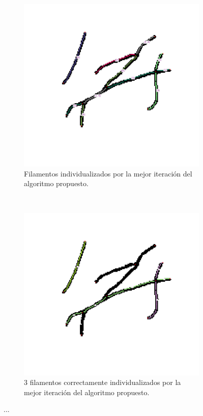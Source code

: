 \begin{figure}[h!]
    \begin{subfigure}[t]{0.49\textwidth}
        \centering
        \includegraphics[scale=0.13]{resultImages/Synth-QuantitativeIFS-Fig7-phil-s1271-v05-antLabeled.png}
        \caption{Filamentos individualizados por la mejor iteraci\'on del algoritmo propuesto.}
        \label{fig:SynthQFS7-Individualizacion}
    \end{subfigure}
    ~
    \begin{subfigure}[t]{0.49\textwidth}
        \centering
        \includegraphics[scale=0.13]{resultImages/Synth-QuantitativeIFS-Fig7-phil-s1271-v05-exactMatch-antLabeled.png}
        \caption{3 filamentos correctamente individualizados  por la mejor iteraci\'on del algoritmo propuesto.}
        \label{fig:SynthQFS7-Individualizacion-Best}
    \end{subfigure}
    
    \caption{...}
    \label{fig:Synth-QIFS-Result}
\end{figure}

